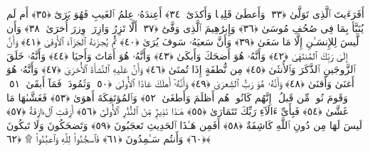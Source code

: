  أَفَرَءَيتَ ٱلَّذِى تَوَلَّىٰ ﴿٣٣﴾
 وَأَعطَىٰ قَلِيلًۭا وَأَكدَىٰٓ ﴿٣٤﴾
 أَعِندَهُۥ عِلمُ ٱلغَيبِ فَهُوَ يَرَىٰٓ ﴿٣٥﴾
 أَم لَم يُنَبَّأ بِمَا فِى صُحُفِ مُوسَىٰ ﴿٣٦﴾
 وَإِبرَٰهِيمَ ٱلَّذِى وَفَّىٰٓ ﴿٣٧﴾
 أَلَّا تَزِرُ وَازِرَةٌۭ وِزرَ أُخرَىٰ ﴿٣٨﴾
 وَأَن لَّيسَ لِلإِنسَـٰنِ إِلَّا مَا سَعَىٰ ﴿٣٩﴾
 وَأَنَّ سَعيَهُۥ سَوفَ يُرَىٰ ﴿٤٠﴾
 ثُمَّ يُجزَىٰهُ ٱلجَزَآءَ ٱلأَوفَىٰ ﴿٤١﴾
 وَأَنَّ إِلَىٰ رَبِّكَ ٱلمُنتَهَىٰ ﴿٤٢﴾
 وَأَنَّهُۥ هُوَ أَضحَكَ وَأَبكَىٰ ﴿٤٣﴾
 وَأَنَّهُۥ هُوَ أَمَاتَ وَأَحيَا ﴿٤٤﴾
 وَأَنَّهُۥ خَلَقَ ٱلزَّوجَينِ ٱلذَّكَرَ وَٱلأُنثَىٰ ﴿٤٥﴾
 مِن نُّطفَةٍ إِذَا تُمنَىٰ ﴿٤٦﴾
 وَأَنَّ عَلَيهِ ٱلنَّشأَةَ ٱلأُخرَىٰ ﴿٤٧﴾
 وَأَنَّهُۥ هُوَ أَغنَىٰ وَأَقنَىٰ ﴿٤٨﴾
 وَأَنَّهُۥ هُوَ رَبُّ ٱلشِّعرَىٰ ﴿٤٩﴾
 وَأَنَّهُۥٓ أَهلَكَ عَادًا ٱلأُولَىٰ ﴿٥٠﴾
 وَثَمُودَا۟ فَمَآ أَبقَىٰ ﴿٥١﴾
 وَقَومَ نُوحٍۢ مِّن قَبلُ ۖ إِنَّهُم كَانُوا۟ هُم أَظلَمَ وَأَطغَىٰ ﴿٥٢﴾
 وَٱلمُؤتَفِكَةَ أَهوَىٰ ﴿٥٣﴾
 فَغَشَّىٰهَا مَا غَشَّىٰ ﴿٥٤﴾
 فَبِأَىِّ ءَالَآءِ رَبِّكَ تَتَمَارَىٰ ﴿٥٥﴾
 هَـٰذَا نَذِيرٌۭ مِّنَ ٱلنُّذُرِ ٱلأُولَىٰٓ ﴿٥٦﴾
 أَزِفَتِ ٱلءَازِفَةُ ﴿٥٧﴾
 لَيسَ لَهَا مِن دُونِ ٱللَّهِ كَاشِفَةٌ ﴿٥٨﴾
 أَفَمِن هَـٰذَا ٱلحَدِيثِ تَعجَبُونَ ﴿٥٩﴾
 وَتَضحَكُونَ وَلَا تَبكُونَ ﴿٦٠﴾
 وَأَنتُم سَـٰمِدُونَ ﴿٦١﴾
 فَٱسجُدُوا۟ لِلَّهِ وَٱعبُدُوا۟ ۩ ﴿٦٢﴾
 
